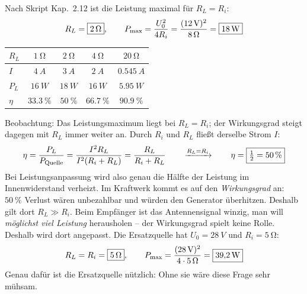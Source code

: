 \documentclass[11pt,a4paper]{article}
\begin{document}
\begin{loesung}
Nach Skript Kap.~2.12 ist die Leistung maximal für $R_L = R_i$:
\[
  R_L = \boxed{\SI{2}{\ohm}},\qquad P_\text{max} = \frac{U_0^2}{4R_i} = \frac{(\SI{12}{V})^2}{\SI{8}{\ohm}} = \boxed{\SI{18}{W}}
\]
\begin{center}
\renewcommand{\arraystretch}{1.2}
\begin{tabular}{l|c|c|c|c}
  $R_L$ & $\SI{1}{\ohm}$ & $\SI{2}{\ohm}$ & $\SI{4}{\ohm}$ & $\SI{20}{\ohm}$\\\hline
  $I$ & $\SI{4}{A}$ & $\SI{3}{A}$ & $\SI{2}{A}$ & $\SI{0.545}{A}$\\\hline
  $P_L$ & $\SI{16}{W}$ & $\SI{18}{W}$ & $\SI{16}{W}$ & $\SI{5.95}{W}$\\\hline
  $\eta$ & $\SI{33.3}{\percent}$ & $\SI{50}{\percent}$ & $\SI{66.7}{\percent}$ & $\SI{90.9}{\percent}$\\
\end{tabular}
\end{center}
Beobachtung: Das Leistungsmaximum liegt bei $R_L = R_i$; der Wirkungsgrad steigt dagegen mit $R_L$ immer weiter an.
Durch $R_i$ und $R_L$ fließt derselbe Strom $I$:
\[
  \eta = \frac{P_L}{P_\text{Quelle}} = \frac{I^2R_L}{I^2(R_i+R_L)} = \frac{R_L}{R_i+R_L}
  \qquad\xrightarrow{R_L=R_i}\qquad \eta = \boxed{\tfrac12 = \SI{50}{\percent}}
\]
Bei Leistungsanpassung wird also genau die Hälfte der Leistung im Innenwiderstand verheizt.
Im Kraftwerk kommt es auf den \emph{Wirkungsgrad} an: $\SI{50}{\percent}$ Verlust wären unbezahlbar und würden den Generator überhitzen. Deshalb gilt dort $R_L \gg R_i$.
Beim Empfänger ist das Antennensignal winzig, man will \emph{möglichst viel Leistung} herausholen -- der Wirkungsgrad spielt keine Rolle. Deshalb wird dort angepasst.
Die Ersatzquelle hat $U_0 = \SI{28}{V}$ und $R_i = \SI{5}{\ohm}$:
\[
  R_L = R_i = \boxed{\SI{5}{\ohm}},\qquad P_\text{max} = \frac{(\SI{28}{V})^2}{4\cdot\SI{5}{\ohm}} = \boxed{\SI{39.2}{W}}
\]
Genau dafür ist die Ersatzquelle nützlich: Ohne sie wäre diese Frage sehr mühsam.
\end{loesung}
\end{document}
